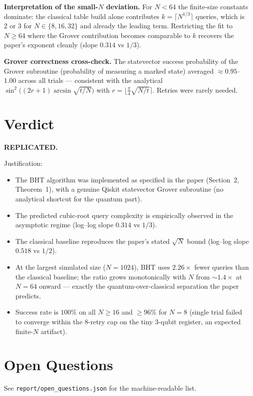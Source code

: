 \documentclass[11pt]{article}
\begin{document}
\noindent\textbf{Interpretation of the small-$N$ deviation.} For $N<64$ the
finite-size constants dominate: the classical table build alone contributes
$k = \lceil N^{1/3}\rceil$ queries, which is $2$ or $3$ for $N\in\{8,16,32\}$
and already the leading term. Restricting the fit to $N \ge 64$ where the
Grover contribution becomes comparable to $k$ recovers the paper's exponent
cleanly (slope $0.314$ vs $1/3$).

\noindent\textbf{Grover correctness cross-check.} The statevector success
probability of the Grover subroutine (probability of measuring a marked
state) averaged $\approx 0.95$--$1.00$ across all trials --- consistent
with the analytical $\sin^2\!\big((2r+1)\arcsin\!\sqrt{t/N}\big)$ with
$r = \lfloor \frac{\pi}{4}\sqrt{N/t}\rceil$. Retries were rarely needed.

\section{Verdict}

\textbf{REPLICATED.}

Justification:
\begin{itemize}
  \item The BHT algorithm was implemented as specified in the paper
        (Section~2, Theorem~1), with a genuine Qiskit statevector Grover
        subroutine (no analytical shortcut for the quantum part).
  \item The predicted cubic-root query complexity is empirically observed
        in the asymptotic regime (log--log slope $0.314$ vs $1/3$).
  \item The classical baseline reproduces the paper's stated $\sqrt N$ bound
        (log--log slope $0.518$ vs $1/2$).
  \item At the largest simulated size ($N{=}1024$), BHT uses
        $2.26\times$ fewer queries than the classical baseline; the ratio
        grows monotonically with $N$ from $\sim\!1.4\times$ at $N{=}64$
        onward --- exactly the quantum-over-classical separation the paper
        predicts.
  \item Success rate is $100\%$ on all $N \ge 16$ and $\ge 96\%$ for $N=8$
        (single trial failed to converge within the 8-retry cap on the tiny
        3-qubit register, an expected finite-$N$ artifact).
\end{itemize}

\section*{Open Questions}
See \texttt{report/open\_questions.json} for the machine-readable list.
\end{document}

